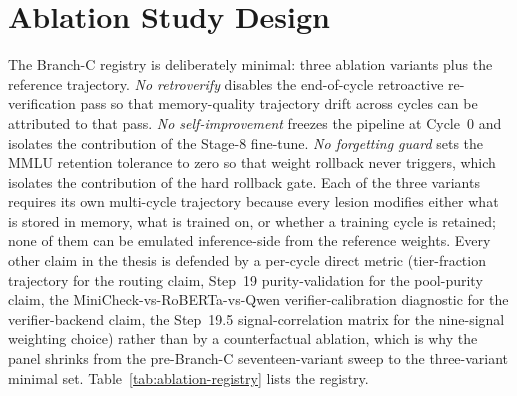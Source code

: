 \section{Ablation Study Design}
\label{sec:ablation-design}

The Branch-C registry is deliberately minimal: three ablation variants plus the reference trajectory. \emph{No retroverify} disables the end-of-cycle retroactive re-verification pass so that memory-quality trajectory drift across cycles can be attributed to that pass. \emph{No self-improvement} freezes the pipeline at Cycle~0 and isolates the contribution of the Stage-8 fine-tune. \emph{No forgetting guard} sets the MMLU retention tolerance to zero so that weight rollback never triggers, which isolates the contribution of the hard rollback gate. Each of the three variants requires its own multi-cycle trajectory because every lesion modifies either what is stored in memory, what is trained on, or whether a training cycle is retained; none of them can be emulated inference-side from the reference weights. Every other claim in the thesis is defended by a per-cycle direct metric (tier-fraction trajectory for the routing claim, Step~19 purity-validation for the pool-purity claim, the MiniCheck-vs-RoBERTa-vs-Qwen verifier-calibration diagnostic for the verifier-backend claim, the Step~19.5 signal-correlation matrix for the nine-signal weighting choice) rather than by a counterfactual ablation, which is why the panel shrinks from the pre-Branch-C seventeen-variant sweep to the three-variant minimal set. Table~\ref{tab:ablation-registry} lists the registry.

